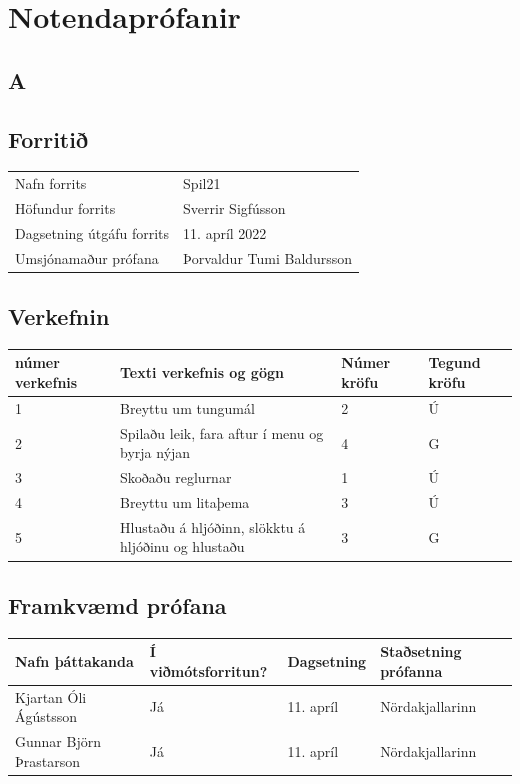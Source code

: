 \documentclass[a4paper]{paper}
\begin{document}
\newpage
\section{Notendaprófanir}
\subsection*{A}
\subsection{Forritið}
\begin{tabular}{|l|l|}
    \hline
    Nafn forrits & Spil21\\
    Höfundur forrits & Sverrir Sigfússon\\
    Dagsetning útgáfu forrits & 11. apríl 2022\\
    Umsjónamaður prófana& Þorvaldur Tumi Baldursson\\
    \hline
\end{tabular}

\subsection{Verkefnin}
\begin{tabular}{|l|p{6cm}|l|l|}
    \hline
    númer verkefnis &Texti verkefnis og gögn                                &Númer kröfu    &Tegund kröfu\\
    \hline
    1               &Breyttu um tungumál                                    &2              &Ú\\\hline
    2               &Spilaðu leik, fara aftur í menu og byrja nýjan         &4              &G\\\hline
    3               &Skoðaðu reglurnar                                      &1              &Ú\\\hline
    4               &Breyttu um litaþema                                    &3              &Ú\\\hline
    5               &Hlustaðu á hljóðinn, slökktu á hljóðinu og hlustaðu    &3              &G\\
    \hline
\end{tabular}

\subsection{Framkvæmd prófana}
\begin{tabular}{|l|l|l|l|}
    \hline
    Nafn þáttakanda         &Í viðmótsforritun?     &Dagsetning     &Staðsetning prófanna\\
    \hline
    Kjartan Óli Ágústsson   &Já                     &11. apríl      &Nördakjallarinn\\
    \hline
    Gunnar Björn Þrastarson &Já                     &11. apríl      &Nördakjallarinn\\
    \hline
\end{tabular}
\end{document}
